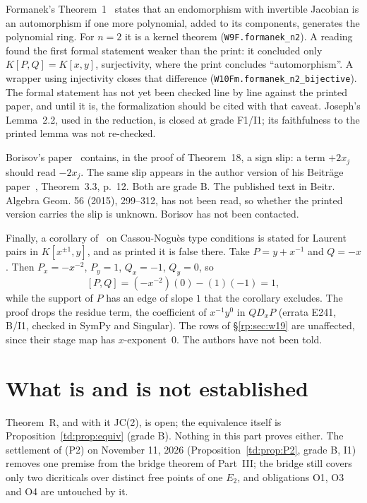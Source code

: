 \documentclass[a4paper,11pt]{article}
\theoremstyle{jsplain}
\theoremstyle{jsdef}
\theoremstyle{jsrem}
\begin{document}
Formanek's Theorem~1~\cite{Formanek1987} states that an endomorphism with invertible Jacobian is an automorphism if one more polynomial, added to its components, generates the polynomial ring. For $n=2$ it is a kernel theorem (\texttt{W9F.\allowbreak{}formanek\_\allowbreak{}n2}). A reading found the first formal statement weaker than the print: it concluded only $K[P,Q]=K[x,y]$, surjectivity, where the print concludes ``automorphism''. A wrapper using injectivity closes that difference (\texttt{W10Fm.\allowbreak{}formanek\_\allowbreak{}n2\_\allowbreak{}bijective}). The formal statement has not yet been checked line by line against the printed paper, and until it is, the formalization should be cited with that caveat. Joseph's Lemma~2.2, used in the reduction, is closed at grade F1/I1; its faithfulness to the printed lemma was not re-checked.

Borisov's paper~\cite{Borisov2009} contains, in the proof of Theorem~18, a sign slip: a term $+2x_j$ should read $-2x_j$. The same slip appears in the author version of his Beitr\"age paper~\cite{Borisov2015author}, Theorem~3.3, p.~12. Both are grade B. The published text in Beitr. Algebra Geom. 56 (2015), 299--312, has not been read, so whether the printed version carries the slip is unknown. Borisov has not been contacted.

Finally, a corollary of~\cite{GGV2} on Cassou-Nogu\`es type conditions is stated for Laurent pairs in $K[x^{\pm1},y]$, and as printed it is false there. Take $P=y+x^{-1}$ and $Q=-x$. Then $P_x=-x^{-2}$, $P_y=1$, $Q_x=-1$, $Q_y=0$, so
\[
[P,Q]=(-x^{-2})(0)-(1)(-1)=1 ,
\]
while the support of $P$ has an edge of slope $1$ that the corollary excludes. The proof drops the residue term, the coefficient of $x^{-1}y^0$ in $QD_xP$ (errata E241, B/I1, checked in SymPy and Singular). The rows of \S\ref{rp:sec:w19} are unaffected, since their stage map has $x$-exponent~$0$. The authors have not been told.

\section{What is and is not established}\label{rp:sec:status}

Theorem~R, and with it JC(2), is open; the equivalence itself is Proposition~\ref{td:prop:equiv} (grade B). Nothing in this part proves either. The settlement of (P2) on November 11, 2026 (Proposition~\ref{td:prop:P2}, grade B, I1) removes one premise from the bridge theorem of Part~III; the bridge still covers only two dicriticals over distinct free points of one $E_2$, and obligations O1, O3 and O4 are untouched by it.
\end{document}
